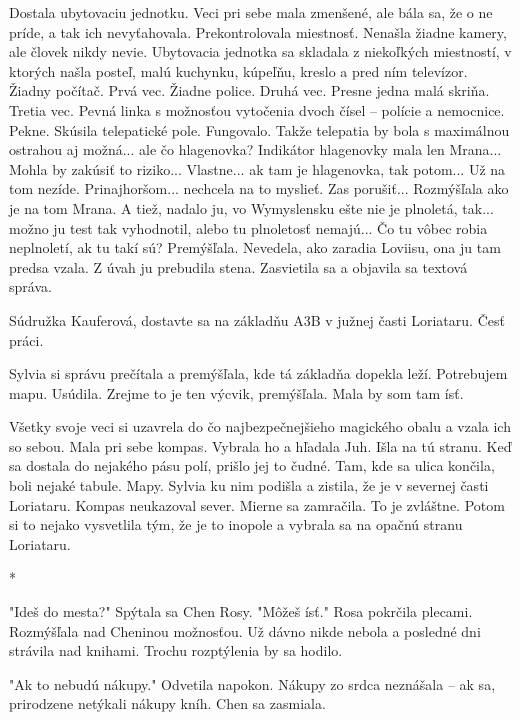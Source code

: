\documentclass{book}
\begin{document}
Dostala ubytovaciu jednotku. Veci pri sebe mala zmenšené, ale bála sa, že o ne príde, a tak ich nevyťahovala. Prekontrolovala miestnosť. Nenašla žiadne kamery, ale človek nikdy nevie. Ubytovacia jednotka sa skladala z niekoľkých miestností, v ktorých našla posteľ, malú kuchynku, kúpeľňu, kreslo a pred ním televízor. Žiadny počítač. Prvá vec. Žiadne police. Druhá vec. Presne jedna malá skriňa. Tretia vec. Pevná linka s možnosťou vytočenia dvoch čísel – polície a nemocnice. Pekne. Skúsila telepatické pole. Fungovalo. Takže telepatia by bola s maximálnou ostrahou aj možná... ale čo hlagenovka? Indikátor hlagenovky mala len Mrana... Mohla by zakúsiť to riziko... Vlastne... ak tam je hlagenovka, tak potom... Už na tom nezíde. Prinajhoršom... nechcela na to myslieť. Zas porušiť... Rozmýšľala ako je na tom Mrana. A tiež, nadalo ju, vo Wymyslensku ešte nie je plnoletá, tak... možno ju test tak vyhodnotil, alebo tu plnoletosť nemajú... Čo tu vôbec robia neplnoletí, ak tu takí sú? Premýšľala. Nevedela, ako zaradia Loviisu, ona ju tam predsa vzala. Z úvah ju prebudila stena. Zasvietila sa a objavila sa textová správa.

Súdružka Kauferová, dostavte sa na základňu A3B v južnej časti Loriataru. Česť práci.

Sylvia si správu prečítala a premýšľala, kde tá základňa dopekla leží. Potrebujem mapu. Usúdila. Zrejme to je ten výcvik, premýšľala. Mala by som tam ísť.

Všetky svoje veci si uzavrela do čo najbezpečnejšieho magického obalu a vzala ich so sebou. Mala pri sebe kompas. Vybrala ho a hľadala Juh. Išla na tú stranu. Keď sa dostala do nejakého pásu polí, prišlo jej to čudné. Tam, kde sa ulica končila, boli nejaké tabule. Mapy. Sylvia ku nim podišla a zistila, že je v severnej časti Loriataru. Kompas neukazoval sever. Mierne sa zamračila. To je zvláštne. Potom si to nejako vysvetlila tým, že je to inopole a vybrala sa na opačnú stranu Loriataru.

\begin{center}

*

\end{center}

"$ $Ideš do mesta?"$ $ Spýtala sa Chen Rosy. "$ $Môžeš ísť."$ $ Rosa pokrčila plecami. Rozmýšľala nad Cheninou možnosťou. Už dávno nikde nebola a posledné dni strávila nad knihami. Trochu rozptýlenia by sa hodilo.

"$ $Ak to nebudú nákupy."$ $ Odvetila napokon. Nákupy zo srdca neznášala – ak sa, prirodzene netýkali nákupy kníh. Chen sa zasmiala.
\end{document}
